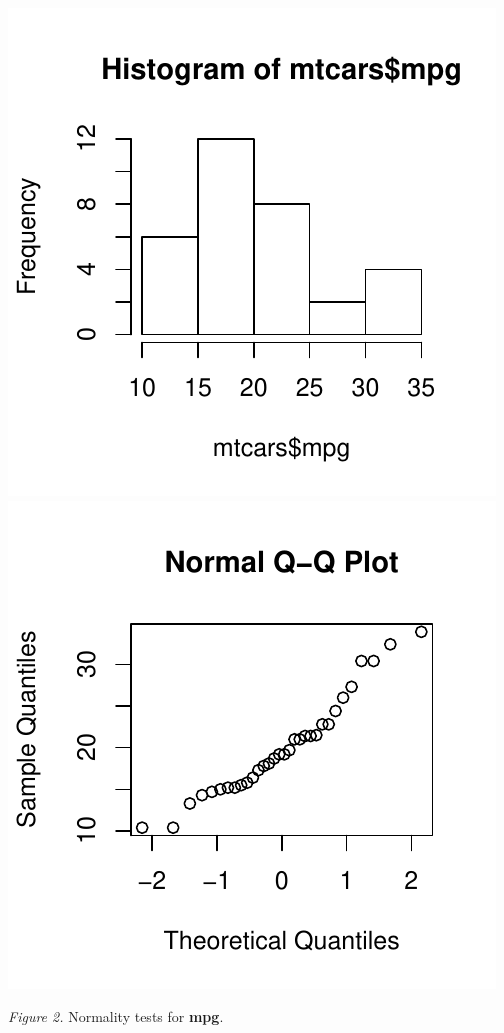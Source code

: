 \documentclass[]{article}
\begin{document}
\includegraphics{Regression_Models_Course_Project_files/figure-latex/unnamed-chunk-3-1.pdf}
\includegraphics{Regression_Models_Course_Project_files/figure-latex/unnamed-chunk-3-2.pdf}

\emph{Figure 2.} Normality tests for \textbf{mpg}.
\end{document}
